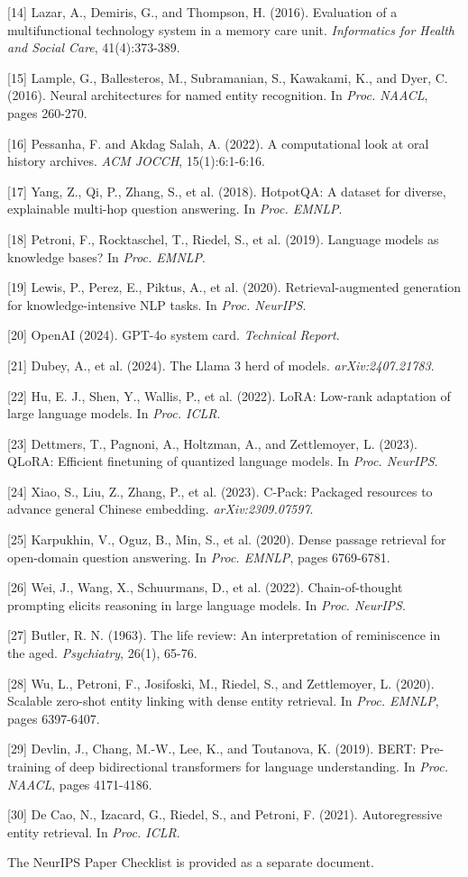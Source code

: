 ﻿\documentclass{article}
\begin{document}
{[}14{]} Lazar, A., Demiris, G., and Thompson, H. (2016). Evaluation of
a multifunctional technology system in a memory care unit.
\emph{Informatics for Health and Social Care}, 41(4):373-389.

{[}15{]} Lample, G., Ballesteros, M., Subramanian, S., Kawakami, K., and
Dyer, C. (2016). Neural architectures for named entity recognition. In
\emph{Proc. NAACL}, pages 260-270.

{[}16{]} Pessanha, F. and Akdag Salah, A. (2022). A computational look
at oral history archives. \emph{ACM JOCCH}, 15(1):6:1-6:16.

{[}17{]} Yang, Z., Qi, P., Zhang, S., et al. (2018). HotpotQA: A dataset
for diverse, explainable multi-hop question answering. In \emph{Proc.
EMNLP}.

{[}18{]} Petroni, F., Rocktaschel, T., Riedel, S., et al. (2019).
Language models as knowledge bases? In \emph{Proc. EMNLP}.

{[}19{]} Lewis, P., Perez, E., Piktus, A., et al. (2020).
Retrieval-augmented generation for knowledge-intensive NLP tasks. In
\emph{Proc. NeurIPS}.

{[}20{]} OpenAI (2024). GPT-4o system card. \emph{Technical Report}.

{[}21{]} Dubey, A., et al. (2024). The Llama 3 herd of models.
\emph{arXiv:2407.21783}.

{[}22{]} Hu, E. J., Shen, Y., Wallis, P., et al. (2022). LoRA: Low-rank
adaptation of large language models. In \emph{Proc. ICLR}.

{[}23{]} Dettmers, T., Pagnoni, A., Holtzman, A., and Zettlemoyer, L.
(2023). QLoRA: Efficient finetuning of quantized language models. In
\emph{Proc. NeurIPS}.

{[}24{]} Xiao, S., Liu, Z., Zhang, P., et al. (2023). C-Pack: Packaged
resources to advance general Chinese embedding. \emph{arXiv:2309.07597}.

{[}25{]} Karpukhin, V., Oguz, B., Min, S., et al. (2020). Dense passage
retrieval for open-domain question answering. In \emph{Proc. EMNLP},
pages 6769-6781.

{[}26{]} Wei, J., Wang, X., Schuurmans, D., et al. (2022).
Chain-of-thought prompting elicits reasoning in large language models.
In \emph{Proc. NeurIPS}.

{[}27{]} Butler, R. N. (1963). The life review: An interpretation of
reminiscence in the aged. \emph{Psychiatry}, 26(1), 65-76.

{[}28{]} Wu, L., Petroni, F., Josifoski, M., Riedel, S., and
Zettlemoyer, L. (2020). Scalable zero-shot entity linking with dense
entity retrieval. In \emph{Proc. EMNLP}, pages 6397-6407.

{[}29{]} Devlin, J., Chang, M.-W., Lee, K., and Toutanova, K. (2019).
BERT: Pre-training of deep bidirectional transformers for language
understanding. In \emph{Proc. NAACL}, pages 4171-4186.

{[}30{]} De Cao, N., Izacard, G., Riedel, S., and Petroni, F. (2021).
Autoregressive entity retrieval. In \emph{Proc. ICLR}.

The NeurIPS Paper Checklist is provided as a separate document.
\end{document}
